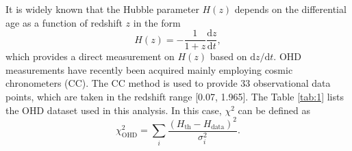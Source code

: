 \documentclass[twocolumn]{aastex631}
\begin{document}
   It is widely known that the Hubble parameter $H(z)$ depends on
   the differential age as a function of redshift $z$ in the form
   \begin{equation}
      H(z)=-\frac{1}{1+z}\frac{\mathrm{d}z}{\mathrm{d}t},
      \label{eq:13}
   \end{equation}
   which provides a direct measurement on $H(z)$ based on
   $\mathrm{d}z/\mathrm{d}t$.
   OHD measurements have recently been acquired mainly employing
   cosmic chronometers (CC). The CC method is used to provide 33 observational
   data points, which are taken in the redshift range [0.07, 1.965].
   The Table \ref{tab:1} lists the OHD dataset used in this analysis.
   In this case, $\chi^2$ can be defined as
   \begin{equation}
      \chi_{\text{OHD}}^2=\sum_i\frac{(H_{\text{th}}-H_{\text{data}})^2}{\sigma_i^2}.
      \label{eq:14}
   \end{equation}
\end{document}
